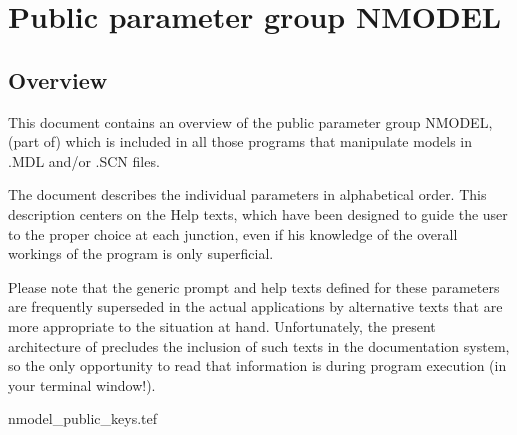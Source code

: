 
\chapter{ Public parameter group NMODEL}
\tableofcontents


\section{ Overview}

	This document contains an overview of the public parameter group NMODEL,
(part of) which is included in all those \NEWSTAR programs that manipulate
models in .MDL and/or .SCN files.



	The
document describes the individual parameters in alphabetical order. This
description centers on the Help texts, which have been designed to guide the
user to the proper choice at each junction, even if his knowledge of the
overall workings of the program is only superficial.

	Please note that the generic prompt and help texts defined for these
parameters are frequently superseded in the actual applications by alternative
texts that are more appropriate to the situation at hand. Unfortunately, the
present architecture of \NEWSTAR precludes the inclusion of such texts in the
documentation system, so the only opportunity to read that information is
during program execution (in your terminal window!).



 {nmodel_public_keys.tef}

